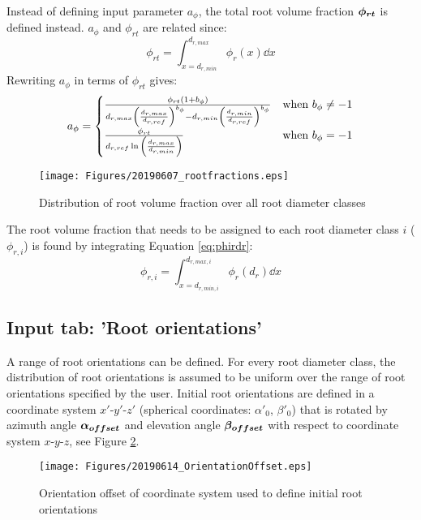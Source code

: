 \documentclass[a4 paper, 11  pt]{article}
\begin{document}
Instead of defining input parameter $a_\phi$, the total root volume fraction $\vb*{\phi_{rt}}$ is defined instead. $a_\phi$ and $\phi_{rt}$ are related since:
\begin{equation}
	\phi_{rt} = \int_{x=d_{r,min}}^{d_{r,max}} \phi_r(x) \dd x
\end{equation}
Rewriting $a_\phi$ in terms of $\phi_{rt}$ gives:
\begin{equation}
	a_\phi = \begin{cases}
	\frac{\phi_{rt} \qty(1+b_\phi)}{d_{r,max}\qty(\frac{d_{r,max}}{d_{r,ref}})^{b_\phi} - d_{r,min}\qty(\frac{d_{r,min}}{d_{r,ref}})^{b_\phi}} & \text{when } b_\phi \neq -1 \\
	\frac{\phi_{rt}}{d_{r,ref} \ln{\qty(\frac{d_{r,max}}{d_{r,min}})}} & \text{when } b_\phi = -1 
	\end{cases}
\end{equation}
\begin{figure}
	\centering
		\texttt{[image: Figures/20190607\_rootfractions.eps]}
	\caption{Distribution of root volume fraction over all root diameter classes}
	\label{fig:rootvolumedistribution}
\end{figure}
The root volume fraction that needs to be assigned to each root diameter class $i$ ($\phi_{r,i}$) is found by integrating Equation \ref{eq:phirdr}:
\begin{equation}
	\phi_{r,i} = \int_{x=d_{r,min,i}}^{d_{r,max,i}} \phi_r(d_r) \dd x
\end{equation}


\subsection{Input tab: 'Root orientations'}
\label{seq:rootorientations}

A range of root orientations can be defined. For every root diameter class, the distribution of root orientations is assumed to be uniform over the range of root orientations specified by the user. 
Initial root orientations are defined in a coordinate system $x'$-$y'$-$z'$ (spherical coordinates: $\alpha'_0$, $\beta'_0$) that is rotated by azimuth angle $\vb*{\alpha_{offset}}$ and elevation angle $\vb*{\beta_{offset}}$ with respect to coordinate system $x$-$y$-$z$, see Figure \ref{fig:orientationoffset}.
\begin{figure}
	\centering
		\texttt{[image: Figures/20190614\_OrientationOffset.eps]}
	\caption{Orientation offset of coordinate system used to define initial root orientations}
	\label{fig:orientationoffset}
\end{figure}
\end{document}
